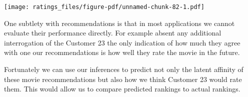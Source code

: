\documentclass[
  letterpaper,
  DIV=11,
  numbers=noendperiod]{scrartcl}
\newenvironment{Shaded}{\begin{snugshade}}{\end{snugshade}}
\newcommand{\AttributeTok}[1]{\textcolor[rgb]{0.40,0.45,0.13}{#1}}
\newcommand{\ControlFlowTok}[1]{\textcolor[rgb]{0.00,0.23,0.31}{#1}}
\newcommand{\DecValTok}[1]{\textcolor[rgb]{0.68,0.00,0.00}{#1}}
\newcommand{\FunctionTok}[1]{\textcolor[rgb]{0.28,0.35,0.67}{#1}}
\newcommand{\NormalTok}[1]{\textcolor[rgb]{0.00,0.23,0.31}{#1}}
\newcommand{\OtherTok}[1]{\textcolor[rgb]{0.00,0.23,0.31}{#1}}
\newcommand{\SpecialCharTok}[1]{\textcolor[rgb]{0.37,0.37,0.37}{#1}}
\newcommand{\StringTok}[1]{\textcolor[rgb]{0.13,0.47,0.30}{#1}}
\begin{document}
\begin{Shaded}
\end{Shaded}

\texttt{[image: ratings\_files/figure-pdf/unnamed-chunk-82-1.pdf]}

One subtlety with recommendations is that in most applications we cannot
evaluate their performance directly. For example absent any additional
interrogation of the Customer 23 the only indication of how much they
agree with one our recommendations is how well they rate the movie in
the future.

Fortunately we can use our inferences to predict not only the latent
affinity of these movie recommendations but also how we think Customer
23 would rate them. This would allow us to compare predicted rankings to
actual rankings.
\end{document}
